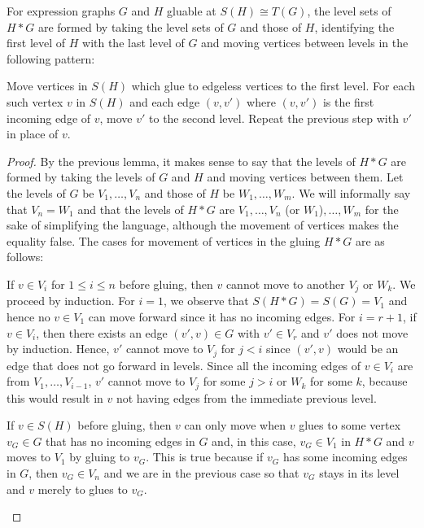 \documentclass[./Thick_TQFTs_and_Quantum_Information.tex]{subfiles}
\begin{document}
\begin{thm}
For expression graphs $G$ and $H$ gluable at $S(H) \cong T(G)$,
the level sets of $H * G$ are formed by taking the level sets of $G$ and those
of $H$, identifying the first level of $H$ with the last level of $G$ and moving
vertices between levels in the following pattern:
\begin{enmrt}
\li Move vertices in $S(H)$ which glue to edgeless vertices to the first level.
\li For each such vertex $v$ in $S(H)$ and each edge $(v, v')$ where $(v, v')$
is the first incoming edge of $v$, move $v'$ to the second level.
\li Repeat the previous step with $v'$ in place of $v$.
\end{enmrt}
\end{thm}
\begin{proof}
By the previous lemma, it makes sense to say that the levels of $H * G$ are
formed by taking the levels of
$G$ and $H$ and moving vertices between them. Let the levels of $G$ be $V_1,
\dots, V_n$ and those of $H$ be $W_1, \dots, W_m$. We will informally say that
$V_n = W_1$ and that the levels of $H * G$ are
$V_1, \dots, V_n $ (or $W_1$)$, \dots, W_m$ for the sake of simplifying the
language, although the movement of vertices makes the equality false. The cases
for movement of vertices in the gluing $H * G$ are as follows:
\begin{enmrt}
\li If $v \in V_i$ for $1 \leq i \leq n$ before gluing, then $v$ cannot move to
another $V_j$ or $W_k$.
We proceed by induction. For $i = 1$, we observe that $S(H * G) = S(G) = V_1$
and hence no $v \in V_1$ can move forward since it has no incoming edges. For
$i = r + 1$, if $v \in V_i$, then there exists an edge $(v', v) \in G$ with
$v' \in V_{r}$ and $v'$ does not move by induction. Hence, $v'$ cannot move to
$V_j$ for $j < i$ since $(v', v)$ would be an edge that does not go forward in
levels. Since all the incoming edges of $v \in V_i$ are from
$V_1, \dots, V_{i - 1}$, $v'$ cannot move to $V_j$ for some $j > i$ or $W_k$ for
some $k$, because this would result in $v$ not having edges from the immediate
previous level.

\li If $v \in S(H)$ before gluing, then $v$ can only move when $v$ glues to some
vertex $v_G \in G$ that has no incoming edges in $G$ and, in this case,
$v_G \in V_1$ in $H * G$ and $v$ moves to $V_1$ by gluing to $v_G$. This is true
because if $v_G$ has some incoming edges in $G$, then $v_G \in V_n$ and we are
in the previous case so that $v_G$ stays in its level and $v$ merely to glues to
$v_G$.


\end{enmrt}
\end{proof}
\end{document}
